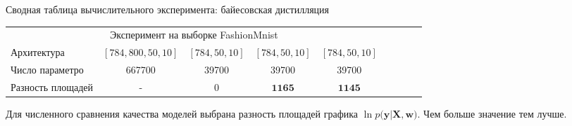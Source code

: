 \documentclass[10pt,pdf,hyperref={unicode}]{beamer}
\begin{document}
\begin{frame}{Сводная таблица вычислительного эксперимента: байесовская дистилляция}
\begin{table}[]
\begin{center}
{\begin{tabular}{|l|c|c|c|c|llll}
\multicolumn{5}{|c|}{Эксперимент на выборке FashionMnist}                                                     &                      &                      &                      &                      \\ \cline{1-5}
Архитектура           & $[784,800,50,10]$& $[784,50,10]$   & $[784,50,10]$  & $[784,50,10]$      &                      &                      &                      &                      \\ \cline{1-5}
Число параметро    &   667700                     &     39700                     &      39700                   &      39700                       &                      &                      &                      &                      \\ \cline{1-5}
Разность площадей   & -                           & 0                       &  $\mathbf{1165}$               & $\mathbf{1145} $                   &                      &                      &                      &                      \\ \cline{1-5}
\end{tabular}
}
\end{center}
\end{table}

Для численного сравнения качества моделей выбрана разность площадей графика $\ln p\bigr(\textbf{y}|\textbf{X}, \textbf{w}\bigr)$. Чем больше значение тем лучше.

\end{frame}
\end{document}
